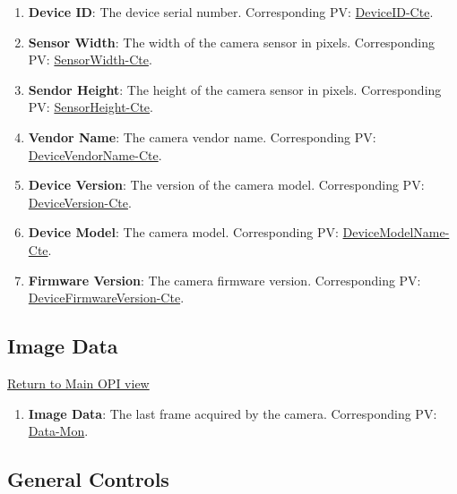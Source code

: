 \documentclass[openany]{article}
\begin{document}
        \begin{enumerate}
            \item \textbf{Device ID}: The device serial number.
                            Corresponding PV: \hyperlink{pv:device-id}{DeviceID-Cte}.
            \item \textbf{Sensor Width}: The width of the camera sensor in 
                            pixels. Corresponding PV: 
                            \hyperlink{pv:sensor-width}{SensorWidth-Cte}.
            \item \textbf{Sendor Height}: The height of the camera sensor in 
                            pixels. Corresponding PV: 
                            \hyperlink{pv:sensor-height}{SensorHeight-Cte}.
            \item \textbf{Vendor Name}: The camera vendor name. 
                            Corresponding PV: 
                            \hyperlink{pv:vendor-name}{DeviceVendorName-Cte}.
            \item \textbf{Device Version}: The version of the camera model.
                            Corresponding PV: 
                            \hyperlink{pv:device-version}{DeviceVersion-Cte}.
            \item \textbf{Device Model}: The camera model. 
                            Corresponding PV: 
                            \hyperlink{pv:device-model}{DeviceModelName-Cte}.
            \item \textbf{Firmware Version}: The camera firmware version.
                            Corresponding PV: 
                            \hyperlink{pv:firmware-version}{DeviceFirmwareVersion-Cte}.
        \end{enumerate}

    \subsection{Image Data}\label{sec:image-data}

        \hyperref[fig:opi-main]{Return to Main OPI view}

        \begin{enumerate}
            \item \textbf{Image Data}: The last frame acquired by the camera.
                            Corresponding PV: \hyperlink{pv:data-mon}{Data-Mon}.
        \end{enumerate}

    \subsection{General Controls}\label{sec:general-controls}
\end{document}
